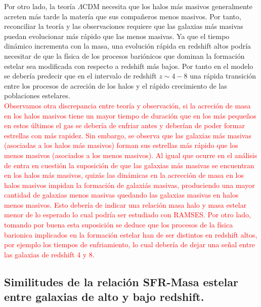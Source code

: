 \documentclass{article}
\begin{document}
Por otro lado, la teoría $\Lambda$CDM necesita que los halos más masivos generalmente acreten más tarde la matería que sus compañeros menos masivos. Por tanto, reconciliar la teoría y las observaciones requiere que las galaxias más masivas puedan evolucionar más rápido que las menos masivas. Ya que el tiempo dinámico incrementa con la masa, una evolución rápida en redshift altos podría necesitar de que la física de los procesos bariónicos que dominan la formación estelar sea modificada con respecto a redshift más bajos. Por tanto en el modelo se debería predecir que en el intervalo de redshift $z\sim 4-8$ una rápida transición entre los procesos de acreción de los halos y el rápido crecimiento de las poblaciones estelares. \\

\textcolor{red}{Observamos otra discrepancia entre teoría y observación, si la acreción de masa en los halos masivos tiene un mayor tiempo de duración que en los más pequeños en estos últimos el gas se debería de enfriar antes y deberían de poder formar estrellas con más rapidez. Sin embargo, se observa que las galaxias más masivas (asociadas a los halos más masivos) forman sus estrellas más rápido que los menos masivos (asociados a los menos masivos). Al igual que ocurre en el análisis de \cite{finkelstein2015increasing} \citep{arranz2015finkelstein} entra en cuestión la suposición de que las galaxias más masivas se encuentran en los halos más masivos, quizás las dinámicas en la acrección de masa en los halos masivos impidan la formación de galaxiás masivas, produciendo una mayor cantidad de galaxias menos masivas quedando las galaxias masivas en halos menos masivos. Esto debería de indicar una relación masa halo y masa estelar menor de lo esperado lo cual podría ser estudiado con RAMSES. Por otro lado, tomando por buena esta suposición se deduce que los procesos de la física barionica implicados en la formación estelar han de ser distintos en redshift altos, por ejemplo los tiempos de enfriamiento, lo cual debería de dejar una señal entre las galaxias de redshift 4 y 8.}\\

\subsection{Similitudes de la relación SFR-Masa estelar entre galaxias de alto y bajo redshift.}
\end{document}
